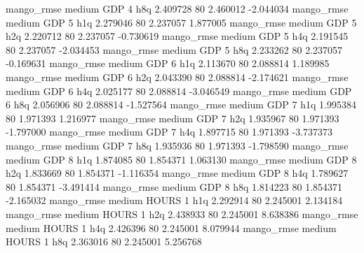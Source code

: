        mango_rmse     medium      GDP                 4                  h8q  2.409728 80       2.460012          -2.044034
       mango_rmse     medium      GDP                 5                  h1q  2.279046 80       2.237057           1.877005
       mango_rmse     medium      GDP                 5                  h2q  2.220712 80       2.237057          -0.730619
       mango_rmse     medium      GDP                 5                  h4q  2.191545 80       2.237057          -2.034453
       mango_rmse     medium      GDP                 5                  h8q  2.233262 80       2.237057          -0.169631
       mango_rmse     medium      GDP                 6                  h1q  2.113670 80       2.088814           1.189985
       mango_rmse     medium      GDP                 6                  h2q  2.043390 80       2.088814          -2.174621
       mango_rmse     medium      GDP                 6                  h4q  2.025177 80       2.088814          -3.046549
       mango_rmse     medium      GDP                 6                  h8q  2.056906 80       2.088814          -1.527564
       mango_rmse     medium      GDP                 7                  h1q  1.995384 80       1.971393           1.216977
       mango_rmse     medium      GDP                 7                  h2q  1.935967 80       1.971393          -1.797000
       mango_rmse     medium      GDP                 7                  h4q  1.897715 80       1.971393          -3.737373
       mango_rmse     medium      GDP                 7                  h8q  1.935936 80       1.971393          -1.798590
       mango_rmse     medium      GDP                 8                  h1q  1.874085 80       1.854371           1.063130
       mango_rmse     medium      GDP                 8                  h2q  1.833669 80       1.854371          -1.116354
       mango_rmse     medium      GDP                 8                  h4q  1.789627 80       1.854371          -3.491414
       mango_rmse     medium      GDP                 8                  h8q  1.814223 80       1.854371          -2.165032
       mango_rmse     medium    HOURS                 1                  h1q  2.292914 80       2.245001           2.134184
       mango_rmse     medium    HOURS                 1                  h2q  2.438933 80       2.245001           8.638386
       mango_rmse     medium    HOURS                 1                  h4q  2.426396 80       2.245001           8.079944
       mango_rmse     medium    HOURS                 1                  h8q  2.363016 80       2.245001           5.256768
